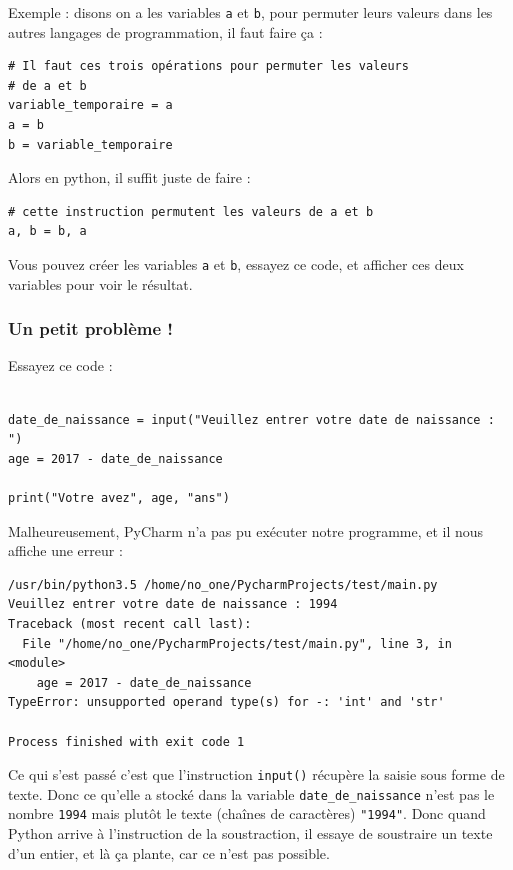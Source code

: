 \documentclass[12pt]{article}
\newcommand{\code}[1]{\colorbox{light-gray}{\texttt{#1}}}
\begin{document}
            Exemple : disons on a les variables \code{a} et
            \code{b}, pour permuter leurs valeurs dans les autres langages de programmation, il faut faire ça :
            \begin{lstlisting}[style=code]
# Il faut ces trois opérations pour permuter les valeurs
# de a et b
variable_temporaire = a
a = b
b = variable_temporaire 
            \end{lstlisting}

            Alors en python, il suffit juste de faire :
            \begin{lstlisting}[style=code]
# cette instruction permutent les valeurs de a et b
a, b = b, a 
            \end{lstlisting}

            Vous pouvez créer les variables \code{a} et \code{b}, essayez ce code, et afficher ces deux variables
            pour voir le résultat. 
        \subsubsection{Un petit problème !}
            Essayez ce code : 
            \begin{lstlisting}[style=code, breaklines=false]

date_de_naissance = input("Veuillez entrer votre date de naissance : ")
age = 2017 - date_de_naissance

print("Votre avez", age, "ans")
            \end{lstlisting}

            Malheureusement, PyCharm n'a pas pu exécuter notre programme, et il nous affiche une erreur :
            \begin{lstlisting}[style=exec_result]
/usr/bin/python3.5 /home/no_one/PycharmProjects/test/main.py
Veuillez entrer votre date de naissance : 1994
Traceback (most recent call last):
  File "/home/no_one/PycharmProjects/test/main.py", line 3, in <module>
    age = 2017 - date_de_naissance
TypeError: unsupported operand type(s) for -: 'int' and 'str'

Process finished with exit code 1
            \end{lstlisting}

            Ce qui s'est passé c'est que l'instruction \code{input()} récupère la saisie sous forme de texte. Donc
            ce qu'elle a stocké dans la variable \code{date\_de\_naissance} n'est pas le nombre \code{1994} mais plutôt
            le texte (chaînes de caractères) \code{"1994"}. Donc quand Python arrive à l'instruction de la soustraction,
            il essaye de soustraire un texte d'un entier, et là ça plante, car ce n'est pas possible.
\end{document}
